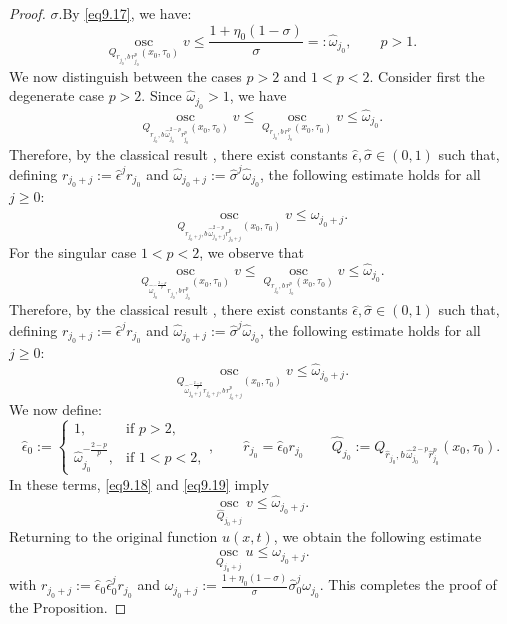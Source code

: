 \documentclass[a4paper,11pt,fullpage]{article}
\DeclareMathOperator*{\osc}{osc}
\numberwithin{equation}{section}
\begin{document}
\begin{proof}
$\sigma$.By \eqref{eq9.17}, we have:
\begin{equation*}
\osc\limits_{Q_{r_{j_0}, b\,r^{p}_{j_0}}(x_0, \tau_0)}v\leqslant \frac{1+\eta_0(1-\sigma)}{\sigma}=:\hat\omega_{j_0},\qquad p>1.
\end{equation*}
We now distinguish between the cases $p>2$ and $1<p<2$.
Consider first the degenerate case $p>2$. Since $\hat{\omega}_{j_0}>1$, we have
\begin{equation*}
\osc\limits_{Q_{r_{j_0}, b\,\hat\omega_{j_0}^{2-p}r^{p}_{j_0}}(x_0, \tau_0)}v \leqslant \osc\limits_{Q_{r_{j_0}, b\,r^{p}_{j_0}}(x_0, \tau_0)}v \leqslant \hat\omega_{j_0}.
\end{equation*}
Therefore, by the classical result \cite[Chapter~3, Proposition~3.1]{DiB1993},
there exist constants $\hat{\epsilon},\hat{\sigma}\in(0,1)$ such that, defining $r_{j_0+j}:=\hat{\epsilon}^jr_{j_0}$ and $\hat\omega_{j_0+j}:=\hat{\sigma}^j\hat\omega_{j_0}$, the following estimate holds for all $j\geqslant0$:
\begin{equation}\label{eq9.18}
\osc\limits_{Q_{r_{j_0+j}, b\,\hat\omega_{j_0+j}^{2-p}r^{p}_{j_0+j}}(x_0, \tau_0)}v\leqslant \hat\omega_{j_0+j}.
\end{equation}
For the singular case $1<p<2$, we observe that
\begin{equation*}
\osc\limits_{Q_{\hat\omega_{j_0}^{-\frac{2-p}{p}}r_{j_0}, b\,r^{p}_{j_0}}(x_0, \tau_0)}v \leqslant \osc\limits_{Q_{r_{j_0}, b\,r^{p}_{j_0}}(x_0, \tau_0)}v \leqslant \hat\omega_{j_0}.
\end{equation*}
Therefore, by the classical result \cite[Chapter~4, Proposition~2.1]{DiB1993}, there exist constants $\hat{\epsilon},\hat{\sigma}\in(0,1)$ such that, defining $r_{j_0+j}:=\hat{\epsilon}^jr_{j_0}$ and $\hat\omega_{j_0+j}:=\hat{\sigma}^j\hat\omega_{j_0}$, the following estimate holds for all $j\geqslant0$:
\begin{equation}\label{eq9.19}
\osc\limits_{Q_{\hat\omega_{j_0+j}^{-\frac{2-p}{p}}r_{j_0+j}, b\,r^{p}_{j_0+j}}(x_0, \tau_0)}v\leqslant \hat\omega_{j_0+j}.
\end{equation}
We now define:
$$
\hat\epsilon_0:=
\begin{cases}
1,&\text{if }p>2,\\
\hat\omega_{j_0}^{-\frac{2-p}{p}},&\text{if }1<p<2,
\end{cases}, 
\qquad \hat{r}_{j_0}=\hat\epsilon_0 r_{j_0}
\qquad \hat{Q}_{j_0}:=Q_{\hat{r}_{j_0}, b\,\hat\omega_{j_0}^{2-p}\hat{r}^{p}_{j_0}}(x_0, \tau_0).
$$
In these terms, \eqref{eq9.18} and \eqref{eq9.19} imply
\begin{equation*}
\osc\limits_{\hat{Q}_{j_0+j}}v\leqslant \hat\omega_{j_0+j}.
\end{equation*}
Returning to the original function $u(x,t)$, we obtain the following estimate
\begin{equation}\label{eq9.20}
\osc\limits_{{Q}_{j_0+j}}u\leqslant \omega_{j_0+j}.
\end{equation}
with $r_{j_0+j}:=\hat\epsilon_0\hat\epsilon_0^jr_{j_0}$ and $\omega_{j_0+j}:=\tfrac{1+\eta_0(1-\sigma)}{\sigma}\hat\sigma_0^j\omega_{j_0}$. This completes the proof of the Proposition. \end{proof}
\end{document}
